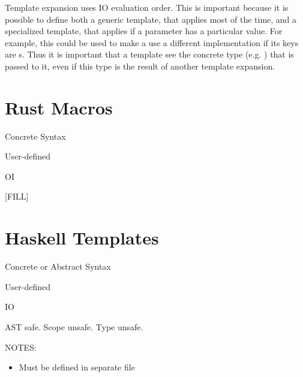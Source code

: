 Template expansion uses IO evaluation order. This is important because
it is possible
to define both a generic template, that applies most of the time, and
a specialized template, that applies if a parameter has a particular
value. For example, this could be used to make a  use a different
implementation if its keys are s. Thus it is important that
a template see the concrete type (e.g. ) that is passed to
it, even if this type is the result of another template expansion.


\section{Rust Macros} \label{sec:rust}

 Concrete Syntax

 User-defined

 OI

 [FILL]



\section{Haskell Templates} \label{sec:haskell}

 Concrete or Abstract Syntax

 User-defined

 IO

 AST safe. Scope unsafe. Type unsafe.

NOTES:
\begin{itemize}
  \item Must be defined in separate file
\end{itemize}

